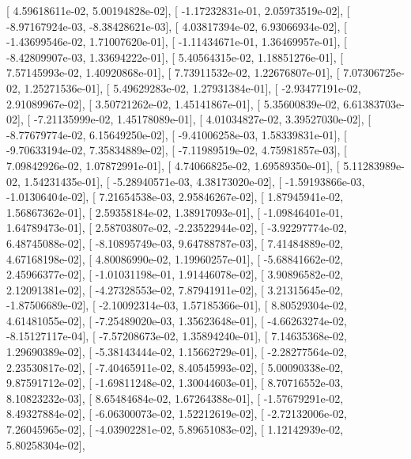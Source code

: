 \documentclass{article}
\begin{document}
       [  4.59618611e-02,   5.00194828e-02],
       [ -1.17232831e-01,   2.05973519e-02],
       [ -8.97167924e-03,  -8.38428621e-03],
       [  4.03817394e-02,   6.93066934e-02],
       [ -1.43699546e-02,   1.71007620e-01],
       [ -1.11434671e-01,   1.36469957e-01],
       [ -8.42809907e-03,   1.33694222e-01],
       [  5.40564315e-02,   1.18851276e-01],
       [  7.57145993e-02,   1.40920868e-01],
       [  7.73911532e-02,   1.22676807e-01],
       [  7.07306725e-02,   1.25271536e-01],
       [  5.49629283e-02,   1.27931384e-01],
       [ -2.93477191e-02,   2.91089967e-02],
       [  3.50721262e-02,   1.45141867e-01],
       [  5.35600839e-02,   6.61383703e-02],
       [ -7.21135999e-02,   1.45178089e-01],
       [  4.01034827e-02,   3.39527030e-02],
       [ -8.77679774e-02,   6.15649250e-02],
       [ -9.41006258e-03,   1.58339831e-01],
       [ -9.70633194e-02,   7.35834889e-02],
       [ -7.11989519e-02,   4.75981857e-03],
       [  7.09842926e-02,   1.07872991e-01],
       [  4.74066825e-02,   1.69589350e-01],
       [  5.11283989e-02,   1.54231435e-01],
       [ -5.28940571e-03,   4.38173020e-02],
       [ -1.59193866e-03,  -1.01306404e-02],
       [  7.21654538e-03,   2.95846267e-02],
       [  1.87945941e-02,   1.56867362e-01],
       [  2.59358184e-02,   1.38917093e-01],
       [ -1.09846401e-01,   1.64789473e-01],
       [  2.58703807e-02,  -2.23522944e-02],
       [ -3.92297774e-02,   6.48745088e-02],
       [ -8.10895749e-03,   9.64788787e-03],
       [  7.41484889e-02,   4.67168198e-02],
       [  4.80086990e-02,   1.19960257e-01],
       [ -5.68841662e-02,   2.45966377e-02],
       [ -1.01031198e-01,   1.91446078e-02],
       [  3.90896582e-02,   2.12091381e-02],
       [ -4.27328553e-02,   7.87941911e-02],
       [  3.21315645e-02,  -1.87506689e-02],
       [ -2.10092314e-03,   1.57185366e-01],
       [  8.80529304e-02,   4.61481055e-02],
       [ -7.25489020e-03,   1.35623648e-01],
       [ -4.66263274e-02,  -8.15127117e-04],
       [ -7.57208673e-02,   1.35894240e-01],
       [  7.14635368e-02,   1.29690389e-02],
       [ -5.38143444e-02,   1.15662729e-01],
       [ -2.28277564e-02,   2.23530817e-02],
       [ -7.40465911e-02,   8.40545993e-02],
       [  5.00090338e-02,   9.87591712e-02],
       [ -1.69811248e-02,   1.30044603e-01],
       [  8.70716552e-03,   8.10823232e-03],
       [  8.65484684e-02,   1.67264388e-01],
       [ -1.57679291e-02,   8.49327884e-02],
       [ -6.06300073e-02,   1.52212619e-02],
       [ -2.72132006e-02,   7.26045965e-02],
       [ -4.03902281e-02,   5.89651083e-02],
       [  1.12142939e-02,   5.80258304e-02],
\end{document}

